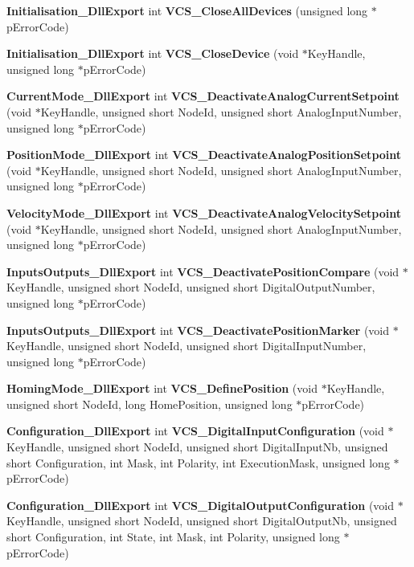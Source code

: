 \begin{DoxyCompactItemize}
{\bf \-Initialisation\-\_\-\-Dll\-Export} int {\bf \-V\-C\-S\-\_\-\-Close\-All\-Devices} (unsigned long $\ast$p\-Error\-Code)
\item 
{\bf \-Initialisation\-\_\-\-Dll\-Export} int {\bf \-V\-C\-S\-\_\-\-Close\-Device} (void $\ast$\-Key\-Handle, unsigned long $\ast$p\-Error\-Code)
\item 
{\bf \-Current\-Mode\-\_\-\-Dll\-Export} int {\bf \-V\-C\-S\-\_\-\-Deactivate\-Analog\-Current\-Setpoint} (void $\ast$\-Key\-Handle, unsigned short \-Node\-Id, unsigned short \-Analog\-Input\-Number, unsigned long $\ast$p\-Error\-Code)
\item 
{\bf \-Position\-Mode\-\_\-\-Dll\-Export} int {\bf \-V\-C\-S\-\_\-\-Deactivate\-Analog\-Position\-Setpoint} (void $\ast$\-Key\-Handle, unsigned short \-Node\-Id, unsigned short \-Analog\-Input\-Number, unsigned long $\ast$p\-Error\-Code)
\item 
{\bf \-Velocity\-Mode\-\_\-\-Dll\-Export} int {\bf \-V\-C\-S\-\_\-\-Deactivate\-Analog\-Velocity\-Setpoint} (void $\ast$\-Key\-Handle, unsigned short \-Node\-Id, unsigned short \-Analog\-Input\-Number, unsigned long $\ast$p\-Error\-Code)
\item 
{\bf \-Inputs\-Outputs\-\_\-\-Dll\-Export} int {\bf \-V\-C\-S\-\_\-\-Deactivate\-Position\-Compare} (void $\ast$\-Key\-Handle, unsigned short \-Node\-Id, unsigned short \-Digital\-Output\-Number, unsigned long $\ast$p\-Error\-Code)
\item 
{\bf \-Inputs\-Outputs\-\_\-\-Dll\-Export} int {\bf \-V\-C\-S\-\_\-\-Deactivate\-Position\-Marker} (void $\ast$\-Key\-Handle, unsigned short \-Node\-Id, unsigned short \-Digital\-Input\-Number, unsigned long $\ast$p\-Error\-Code)
\item 
{\bf \-Homing\-Mode\-\_\-\-Dll\-Export} int {\bf \-V\-C\-S\-\_\-\-Define\-Position} (void $\ast$\-Key\-Handle, unsigned short \-Node\-Id, long \-Home\-Position, unsigned long $\ast$p\-Error\-Code)
\item 
{\bf \-Configuration\-\_\-\-Dll\-Export} int {\bf \-V\-C\-S\-\_\-\-Digital\-Input\-Configuration} (void $\ast$\-Key\-Handle, unsigned short \-Node\-Id, unsigned short \-Digital\-Input\-Nb, unsigned short \-Configuration, int \-Mask, int \-Polarity, int \-Execution\-Mask, unsigned long $\ast$p\-Error\-Code)
\item 
{\bf \-Configuration\-\_\-\-Dll\-Export} int {\bf \-V\-C\-S\-\_\-\-Digital\-Output\-Configuration} (void $\ast$\-Key\-Handle, unsigned short \-Node\-Id, unsigned short \-Digital\-Output\-Nb, unsigned short \-Configuration, int \-State, int \-Mask, int \-Polarity, unsigned long $\ast$p\-Error\-Code)

\end{DoxyCompactItemize}
